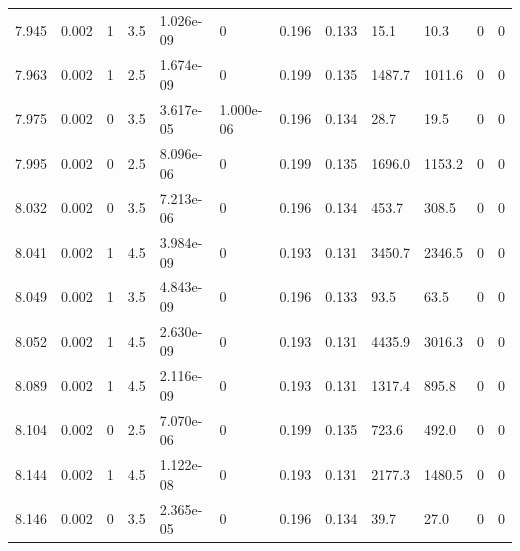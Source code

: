 \documentclass[preview]{standalone}
\begin{document}
{{{{{{{{\begin{tabular}{L{1.2cm}C{1.2cm} C{0.3cm}C{0.5cm} C{1.4cm}C{1.4cm} C{1.4cm}C{1.4cm} C{1.6cm}C{1.6cm} C{1.6cm}C{1.6cm}}
  7.945  &  0.002  & 1     & 3.5 &  1.026e-09  & 0  &  0.196&   0.133& 15.1 & 10.3   &  0 & 0  \\ 
  7.963  &  0.002  & 1     & 2.5 &  1.674e-09  & 0  &  0.199&   0.135& 1487.7 & 1011.6   &  0 & 0  \\ 
  7.975  &  0.002  & 0     & 3.5 &  3.617e-05  & 1.000e-06  &  0.196&   0.134& 28.7 & 19.5   &  0 & 0  \\ 
  7.995  &  0.002  & 0     & 2.5 &  8.096e-06  & 0  &  0.199&   0.135& 1696.0 & 1153.2   &  0 & 0  \\ 
  8.032  &  0.002  & 0     & 3.5 &  7.213e-06  & 0  &  0.196&   0.134& 453.7 & 308.5   &  0 & 0  \\ 
  8.041  &  0.002  & 1     & 4.5 &  3.984e-09  & 0  &  0.193&   0.131& 3450.7 & 2346.5   &  0 & 0  \\ 
  8.049  &  0.002  & 1     & 3.5 &  4.843e-09  & 0  &  0.196&   0.133& 93.5 & 63.5   &  0 & 0  \\ 
  8.052  &  0.002  & 1     & 4.5 &  2.630e-09  & 0  &  0.193&   0.131& 4435.9 & 3016.3   &  0 & 0  \\ 
  8.089  &  0.002  & 1     & 4.5 &  2.116e-09  & 0  &  0.193&   0.131& 1317.4 & 895.8   &  0 & 0  \\ 
  8.104  &  0.002  & 0     & 2.5 &  7.070e-06  & 0  &  0.199&   0.135& 723.6 & 492.0   &  0 & 0  \\ 
  8.144  &  0.002  & 1     & 4.5 &  1.122e-08  & 0  &  0.193&   0.131& 2177.3 & 1480.5   &  0 & 0  \\ 
  8.146  &  0.002  & 0     & 3.5 &  2.365e-05  & 0  &  0.196&   0.134& 39.7 & 27.0   &  0 & 0  \\ 
\hline 
\end{tabular} 

}}}}}}}}
\end{document}
